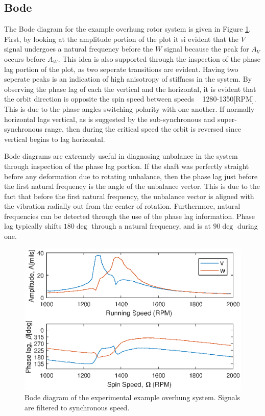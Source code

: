 \subsection{Bode}
The Bode diagram for the example overhung rotor system is given in Figure \ref{fig:ExpExampleBode}. First, by looking at the amplitude portion of the plot it si evident that the $ V $ signal undergoes a natural frequency before the $ W $ signal because the peak for $ A_V $ occurs before $ A_W $. This idea is also supported through the inspection of the phase lag portion of the plot, as two seperate transitions are evident. Having two seperate peaks is an indication of high anisotropy of stiffness in the system. By observing the phase lag of each the vertical and the horizontal, it is evident that the orbit direction is opposite the spin speed between speeds ~ 1280-1350[RPM]. This is due to the phase angles switching polarity with one another. If normally horizontal lags vertical, as is suggested by the sub-synchronous and super-synchronous range, then during the critical speed the orbit is reversed since vertical begins to lag horizontal.\par
Bode diagrams are extremely useful in diagnosing unbalance in the system through inspection of the phase lag portion. If the shaft was perfectly straight before any deformation due to rotating unbalance, then the phase lag just before the first natural frequency is the angle of the unbalance vector. This is due to the fact that before the first natural frequency, the unbalance vector is aligned with the vibration radially out from the center of rotation. Furthermore, natural frequencies can be detected through the use of the phase lag information. Phase lag typically shifts $ 180\deg $ through a natural frequency, and is at $ 90\deg $ during one.
\begin{figure}
	\centering
	\includegraphics[]{./figures/ExpExampleBode.eps}
	\caption{Bode diagram of the experimental example overhung system. Signals are filtered to synchronous speed.}
	\label{fig:ExpExampleBode}
\end{figure}
